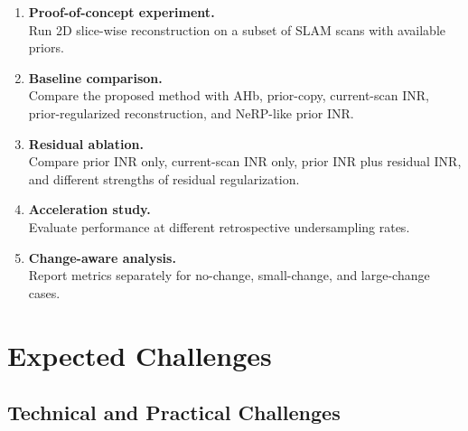 \documentclass[11pt,a4paper]{article}
\begin{document}
\begin{enumerate}
    \item \textbf{Proof-of-concept experiment.} \\
    Run 2D slice-wise reconstruction on a subset of SLAM scans with available priors.

    \item \textbf{Baseline comparison.} \\
    Compare the proposed method with AHb, prior-copy, current-scan INR, prior-regularized reconstruction, and NeRP-like prior INR.

    \item \textbf{Residual ablation.} \\
    Compare prior INR only, current-scan INR only, prior INR plus residual INR, and different strengths of residual regularization.

    \item \textbf{Acceleration study.} \\
    Evaluate performance at different retrospective undersampling rates.

    \item \textbf{Change-aware analysis.} \\
    Report metrics separately for no-change, small-change, and large-change cases.
\end{enumerate}

\section{Expected Challenges}

\subsection{Technical and Practical Challenges}
\end{document}
